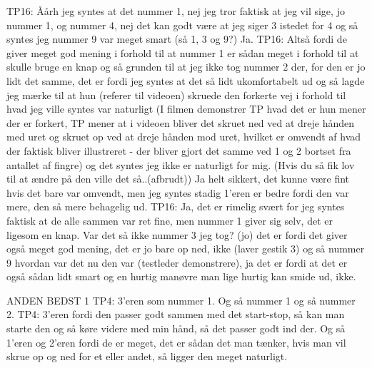 TP16: Åårh jeg syntes at det nummer 1, nej jeg tror faktisk at jeg vil sige, jo nummer 1, og nummer 4, nej det kan godt være at jeg siger 3 istedet for 4 og så syntes jeg nummer 9 var meget smart (så 1, 3 og 9?) Ja. 
TP16: Altså fordi de giver meget god mening i forhold til at nummer 1 er sådan meget i forhold til at skulle bruge en knap og så grunden til at jeg ikke tog nummer 2 der, for den er jo lidt det samme, det er fordi jeg syntes at det så lidt ukomfortabelt ud og så lagde jeg mærke til at hun (referer til videoen) skruede den forkerte vej i forhold til hvad jeg ville syntes var naturligt (I filmen demonstrer TP hvad det er hun mener der er forkert, TP mener at i videoen bliver det skruet ned ved at dreje hånden med uret og skruet op ved at dreje hånden mod uret, hvilket er omvendt af hvad der faktisk bliver illustreret - der bliver gjort det samme ved 1 og 2 bortset fra antallet af fingre) og det syntes jeg ikke er naturligt for mig. (Hvis du så fik lov til at ændre på den ville det så..(afbrudt)) Ja helt sikkert, det kunne være fint hvis det bare var omvendt, men jeg syntes stadig 1’eren er bedre fordi den var mere, den så mere behagelig ud.   
TP16: Ja, det er rimelig svært for jeg syntes faktisk at de alle sammen var ret fine, men nummer 1 giver sig selv, det er ligesom en knap. Var det så ikke nummer 3 jeg tog? (jo) det er fordi det giver også meget god mening, det er jo bare op ned, ikke (laver gestik 3) og så nummer 9 hvordan var det nu den var (testleder demonstrere), ja det er fordi at det er også sådan lidt smart og en hurtig manøvre man lige hurtig kan smide ud, ikke. 

ANDEN BEDST 1
TP4: 3’eren som nummer 1. Og så nummer 1 og så nummer 2.
TP4: 3’eren fordi den passer godt sammen med det start-stop, så kan man starte den og så køre videre med min hånd, så det passer godt ind der. Og så 1’eren og 2’eren fordi de er meget, det er sådan det man tænker, hvis man vil skrue op og ned for et eller andet, så ligger den meget naturligt. 

